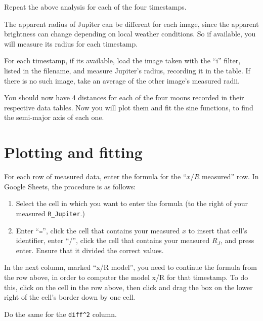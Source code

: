 \begin{steps}
	\item Repeat the above analysis for each of the four timestamps.
\end{steps}

The apparent radius of Jupiter can be different for each image, since the apparent brightness can change depending on local weather conditions. So if available, you will measure its radius for each timestamp.

\begin{steps} 
	\item For each timestamp, if its available, load the image taken with the ``i'' filter, listed in the filename, and measure Jupiter's radius, recording it in the table. If there is no such image, take an average of the other image's measured radii.
\end{steps}

You should now have 4 distances for each of the four moons recorded in their respective data tables. Now you will plot them and fit the sine functions, to find the semi-major axis of each one.

\section{Plotting and fitting}

\begin{steps}
	\item For each row of measured data, enter the formula for the ``$x/R$ measured'' row. In Google Sheets, the procedure is as follows:
	\begin{enumerate}
		\item Select the cell in which you want to enter the formula (to the right of your measured \texttt{R\_Jupiter}.)
		
		\item Enter ``\texttt{=}'', click the cell that contains your measured $x$ to insert that cell's identifier, enter ``/'', click the cell that contains your measured $R_J$, and press enter. Ensure that it divided the correct values.
	\end{enumerate}

	\item In the next column, marked ``x/R model'', you need to continue the formula from the row above, in order to computer the model x/R for that timestamp. To do this, click on the cell in the row above, then click and drag the box on the lower right of the cell's border down by one cell.
	
	\item Do the same for the \texttt{diff\^{}2} column.
\end{steps}

